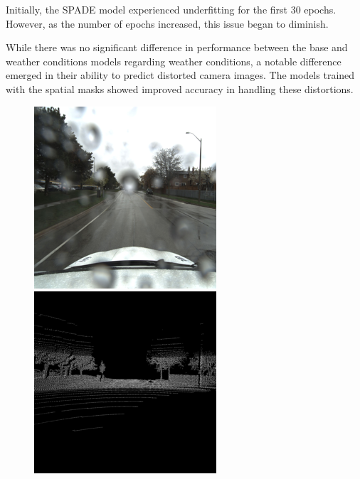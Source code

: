 Initially, the SPADE model experienced underfitting for the first 30 epochs. However, as the number of epochs increased, this issue began to diminish.

While there was no significant difference in performance between the base and weather conditions models regarding weather conditions, a notable difference emerged in their ability to predict distorted camera images. The models trained with the spatial masks showed improved accuracy in handling these distortions.
\begin{figure}[!ht]
    \begin{minipage}[t]{.24\linewidth}
        \includegraphics[width=\linewidth]{imgs/base/camera.png}
    \end{minipage}\hfill
    \begin{minipage}[t]{.24\linewidth}
        \includegraphics[width=\linewidth]{imgs/base/ground.png}

\end{minipage}
\end{figure}

